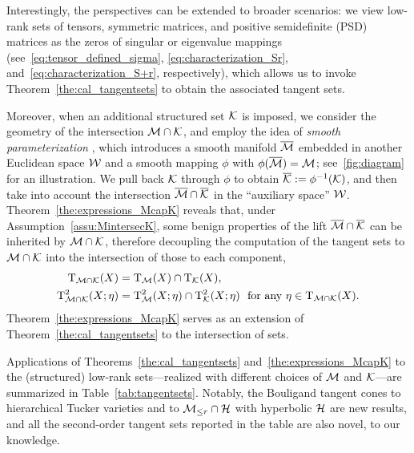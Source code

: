 Interestingly, the perspectives can be extended to broader scenarios: we view low-rank sets of tensors, symmetric matrices, and positive semidefinite (PSD) matrices as the zeros of singular or eigenvalue mappings (see~\eqref{eq:tensor_defined_sigma}, \eqref{eq:characterization_Sr}, and~\eqref{eq:characterization_S+r}, respectively), which allows us to invoke Theorem~\ref{the:cal_tangentsets} to obtain the associated tangent sets.

Moreover, when an additional structured set $\mathcal{K}$ is imposed, we consider the geometry of the intersection $\mathcal{M}\cap\mathcal{K}$, and employ the idea of \emph{smooth parameterization} \cite{levin2025effect}, which introduces a smooth manifold $\overline{\mathcal{M}}$ embedded in another Euclidean space $\mathcal{W}$ and a smooth mapping $\phi$ with $\phi(\overline{\mathcal{M}})=\mathcal{M}$; see~\myfig\ref{fig:diagram} for an illustration. We pull back $\mathcal{K}$ through $\phi$ to obtain $\overline{\mathcal{K}}:=\phi^{-1}(\mathcal{K})$, and then take into account the intersection $\overline{\mathcal{M}}\cap\overline{\mathcal{K}}$ in the ``auxiliary space'' $\mathcal{W}$. Theorem~\ref{the:expressions_McapK} reveals that, under Assumption~\ref{assu:MintersecK}, some benign properties of the lift $\overline{\mathcal{M}}\cap\overline{\mathcal{K}}$ can be inherited by $\mathcal{M}\cap\mathcal{K}$, therefore decoupling the computation of the tangent sets to $\mathcal{M}\cap\mathcal{K}$ into the intersection of those to each component,
\begin{equation*}
\begin{aligned}
    \Btangent_{\manifold\cap\kanifold}(X) &= \Btangent_{\manifold}(X)\cap\Btangent_{\kanifold}(X),
    \\
    \tangenttwo_{\manifold\cap\kanifold}(X;\eta) &= \tangenttwo_{\manifold}(X;\eta)\cap\tangenttwo_{\kanifold}(X;\eta)\ \ \text{for any}\ \eta\in\Btangent_{\manifold\cap\kanifold}(X).
\end{aligned}
\end{equation*}
Theorem~\ref{the:expressions_McapK} serves as an extension of Theorem~\ref{the:cal_tangentsets} to the intersection of sets.

Applications of Theorems~\ref{the:cal_tangentsets} and~\ref{the:expressions_McapK} to the (structured) low-rank sets---realized with different choices of $\mathcal{M}$ and $\mathcal{K}$---are summarized in Table~\ref{tab:tangentsets}. Notably, the Bouligand tangent cones to hierarchical Tucker varieties and to $\mathcal{M}_{\le r}\cap\mathcal{H}$ with hyperbolic $\mathcal{H}$ are new results, and all the second-order tangent sets reported in the table are also novel, to our knowledge.

